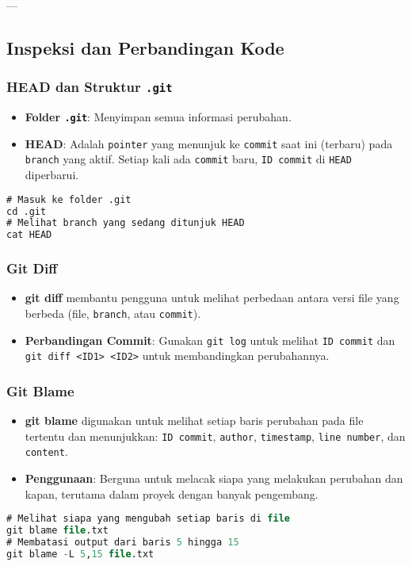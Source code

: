 \documentclass{article}
\begin{document}
---

\subsection{Inspeksi dan Perbandingan Kode}

\subsubsection{HEAD dan Struktur \texttt{.git}}
\begin{itemize}
    \item \textbf{Folder \texttt{.git}}: Menyimpan semua informasi perubahan.
    \item \textbf{HEAD}: Adalah \texttt{pointer} yang menunjuk ke \texttt{commit} saat ini (terbaru) pada \texttt{branch} yang aktif. Setiap kali ada \texttt{commit} baru, \texttt{ID commit} di \texttt{HEAD} diperbarui.
\end{itemize}
\begin{lstlisting}[language=SQL, caption={Melihat Referensi HEAD}, captionpos=b]
# Masuk ke folder .git
cd .git
# Melihat branch yang sedang ditunjuk HEAD
cat HEAD 
\end{lstlisting}

\subsubsection{Git Diff}
\begin{itemize}
    \item \textbf{git diff} membantu pengguna untuk melihat perbedaan antara versi file yang berbeda (file, \texttt{branch}, atau \texttt{commit}).
    \item \textbf{Perbandingan Commit}: Gunakan \texttt{git log} untuk melihat \texttt{ID commit} dan \texttt{git diff <ID1> <ID2>} untuk membandingkan perubahannya.
\end{itemize}

\subsubsection{Git Blame}
\begin{itemize}
    \item \textbf{git blame} digunakan untuk melihat setiap baris perubahan pada file tertentu dan menunjukkan: \texttt{ID commit}, \texttt{author}, \texttt{timestamp}, \texttt{line number}, dan \texttt{content}.
    \item \textbf{Penggunaan}: Berguna untuk melacak siapa yang melakukan perubahan dan kapan, terutama dalam proyek dengan banyak pengembang.
\end{itemize}
\begin{lstlisting}[language=SQL, caption={Penggunaan Git Blame}, captionpos=b]
# Melihat siapa yang mengubah setiap baris di file
git blame file.txt
# Membatasi output dari baris 5 hingga 15
git blame -L 5,15 file.txt
\end{lstlisting}
\end{document}
